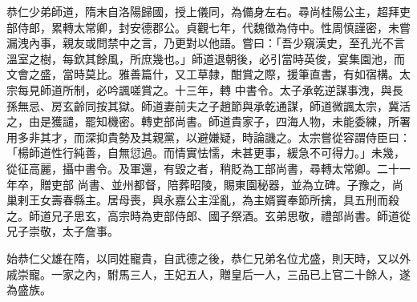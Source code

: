 \begin{pinyinscope}
 恭仁少弟師道，隋末自洛陽歸國，授上儀同，為備身左右。尋尚桂陽公主，超拜吏部侍郎，累轉太常卿，封安德郡公。貞觀七年，代魏徵為侍中。性周慎謹密，未嘗漏洩內事，親友或問禁中之言，乃更對以他語。嘗曰：「吾少窺漢史，至孔光不言溫室之樹，每欽其餘風，所庶幾也。」師道退朝後，必引當時英俊，宴集園池，而文會之盛，當時莫比。雅善篇什，又工草隸，酣賞之際，援筆直書，有如宿構。太宗每見師道所制，必吟諷嗟賞之。十三年，轉
 中書令。太子承乾逆謀事洩，與長孫無忌、房玄齡同按其獄。師道妻前夫之子趙節與承乾通謀，師道微諷太宗，冀活之，由是獲譴，罷知機密。轉吏部尚書。師道貴家子，四海人物，未能委練，所署用多非其才，而深抑貴勢及其親黨，以避嫌疑，時論譏之。太宗嘗從容謂侍臣曰：「楊師道性行純善，自無愆過。而情實怯懦，未甚更事，緩急不可得力。」未幾，從征高麗，攝中書令。及軍還，有毀之者，稍貶為工部尚書，尋轉太常卿。二十一年卒，贈吏部
 尚書、並州都督，陪葬昭陵，賜東園秘器，並為立碑。子豫之，尚巢剌王女壽春縣主。居母喪，與永嘉公主淫亂，為主婿竇奉節所擒，具五刑而殺之。師道兄子思玄，高宗時為吏部侍郎、國子祭酒。玄弟思敬，禮部尚書。師道從兄子崇敬，太子詹事。



 始恭仁父雄在隋，以同姓寵貴，自武德之後，恭仁兄弟名位尤盛，則天時，又以外戚崇寵。一家之內，駙馬三人，王妃五人，贈皇后一人，三品已上官二十餘人，遂為盛族。




\end{pinyinscope}
